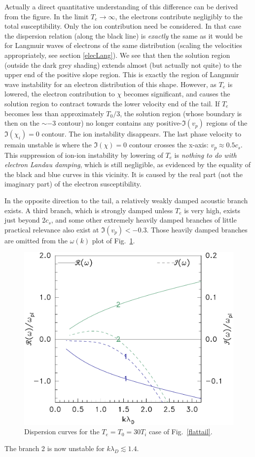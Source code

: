 \documentclass[12pt]{article}
\begin{document}
Actually a direct quantitative understanding of this difference can be
derived from the figure. In the limit $T_e\to \infty$, the electrons
contribute negligibly to the total susceptibility. Only the ion
contribution need be considered. In that case the dispersion relation
(along the black line) is \emph{exactly} the same as it would be for
Langmuir waves of electrons of the same distribution (scaling the
velocities appropriately, see section \ref{elecLang}). We see that
then the solution region (outside the dark grey shading) extends
almost (but actually not quite) to the upper end of the positive slope
region. This is exactly the region of Langmuir wave instability for an
electron distribution of this shape. However, as $T_e$ is lowered, the
electron contribution to $\chi$ becomes significant, and causes the
solution region to contract towards the lower velocity end of the
tail. If $T_e$ becomes less than approximately $T_0/3$, the solution
region (whose boundary is then on the $\sim-3$ contour) no longer
contains any positive-$\Im(v_p)$ regions of the $\Im(\chi_i)=0$
contour. The ion instability disappears.  The last phase velocity to
remain unstable is where the $\Im(\chi)=0$ contour crosses the x-axis:
$v_p\approx 0.5 c_s$. This suppression of ion-ion instability by
lowering of $T_e$ is \emph{nothing to do with electron Landau
  damping}, which is still negligible, as evidenced by the equality of
the black and blue curves in this vicinity. It is caused by the real part
(not the imaginary part) of the electron susceptibility.

In the opposite direction to the tail, a relatively weakly damped
acoustic branch exists. A third branch, which is strongly damped
unless $T_e$ is very high, exists just beyond $2c_{s}$, and some other
extremely heavily damped branches of little practical relevance also exist at
$\Im(v_{p})<-0.3$. Those heavily damped branches are omitted from the
$\omega(k)$ plot of Fig.\ \ref{fig:flattailok}.
\begin{figure}[htp]
  \centering
  \includegraphics[width=0.6\hsize]{flattailok}
  \caption{Dispersion curves for the $T_e=T_0=30T_i$ case of Fig.\
    \ref{flattail}.}
  \label{fig:flattailok}
\end{figure}
The branch 2 is now unstable for $k\lambda_D\lesssim 1.4$.
\end{document}
